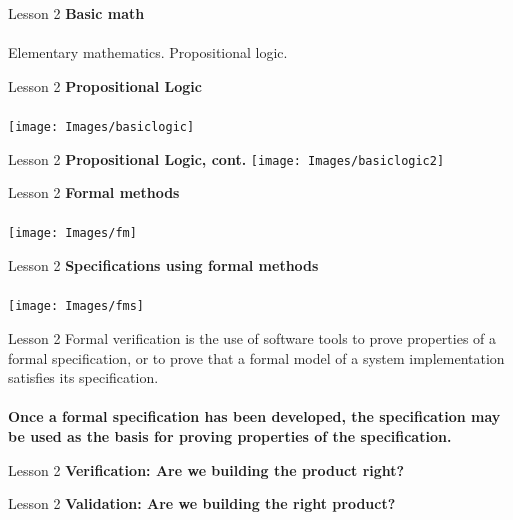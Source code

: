 \documentclass[aspectratio=1610]{beamer}
\begin{document}
\begin{frame}{Lesson 2}{}
\LARGE
\textbf{Basic math}\\~\\
Elementary mathematics. Propositional logic.
\end{frame}


\begin{frame}{Lesson 2}{}
\LARGE
\textbf{Propositional Logic}\\~\\
\texttt{[image: Images/basiclogic]}
\end{frame}


\begin{frame}{Lesson 2}{}
\LARGE
\textbf{Propositional Logic, cont.}
\texttt{[image: Images/basiclogic2]}
\end{frame}



\begin{frame}{Lesson 2}{}
\LARGE
\textbf{Formal methods}\\~\\
\texttt{[image: Images/fm]}
\end{frame}


\begin{frame}{Lesson 2}{}
\LARGE
\textbf{Specifications using formal methods}\\~\\
\texttt{[image: Images/fms]}
\end{frame}


\begin{frame}{Lesson 2}{}
\LARGE
    Formal verification is the use of software tools to prove properties of a formal specification, or to prove that a formal model of a system implementation satisfies its specification.\\~\\
\textbf{Once a formal specification has been developed, the specification may be used as the basis for proving properties of the specification.}
\end{frame}


\begin{frame}{Lesson 2}{}
\LARGE
    \textbf{Verification: Are we building the product right?}

\end{frame}

\begin{frame}{Lesson 2}{}
\LARGE
    \textbf{Validation: Are we building the right product?}
\end{frame}
\end{document}
